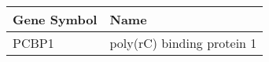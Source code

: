 \begin{tabular}{ll}
\toprule
Gene Symbol &                       Name \\
\midrule
      PCBP1 & poly(rC) binding protein 1 \\
\bottomrule
\end{tabular}
